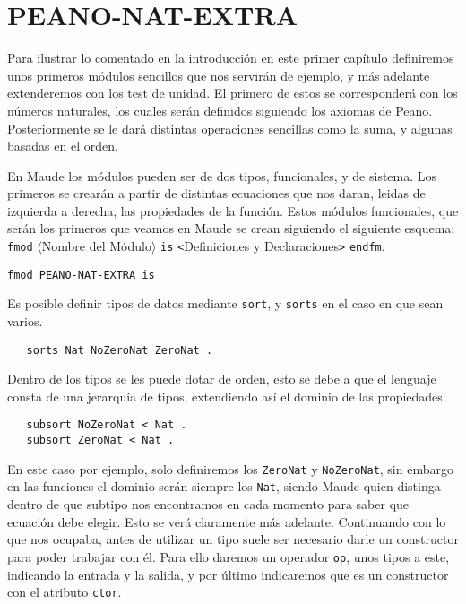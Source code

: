
\section{PEANO-NAT-EXTRA}

Para ilustrar lo comentado en la introducción en este primer capítulo definiremos unos primeros módulos sencillos que nos servirán de ejemplo, y más adelante extenderemos con los test de unidad.
El primero de estos se corresponderá con los números naturales, los cuales serán definidos siguiendo los axiomas de Peano. Posteriormente se le dará distintas operaciones sencillas como la suma, y algunas basadas en el orden.\par

En Maude los módulos pueden ser de dos tipos, funcionales, y de sistema. Los primeros se crearán a partir de distintas ecuaciones que nos daran, leidas de izquierda a derecha, las propiedades de la función. Estos módulos funcionales, que serán los primeros que veamos en Maude se crean siguiendo el siguiente esquema: \texttt{fmod} $\langle$Nombre del Módulo$\rangle$ \texttt{is} \verb"<"Definiciones y Declaraciones\verb">" \texttt{endfm}.\par

{\codesize
\begin{verbatim}
fmod PEANO-NAT-EXTRA is
\end{verbatim}
}

Es posible definir tipos de datos mediante \texttt{sort}, y \texttt{sorts} en el caso en que sean varios. \par

{\codesize
\begin{verbatim}
   sorts Nat NoZeroNat ZeroNat .
\end{verbatim}
}

Dentro de los tipos se les puede dotar de orden, esto se debe a que el lenguaje consta de una jerarquía de tipos, extendiendo así el dominio de las propiedades. \par

{\codesize
\begin{verbatim}
   subsort NoZeroNat < Nat .
   subsort ZeroNat < Nat .
\end{verbatim}
}

En este caso por ejemplo, solo definiremos los \texttt{ZeroNat} y \texttt{NoZeroNat}, sin embargo en las funciones el dominio serán siempre los \texttt{Nat}, siendo Maude quien distinga dentro de que subtipo nos encontramos en cada momento para saber que ecuación debe elegir. Esto se verá claramente más adelante. Continuando con lo que nos ocupaba, antes de utilizar un tipo suele ser necesario darle un constructor para poder trabajar con él. Para ello daremos un operador \texttt{op}, unos tipos a este, indicando la entrada y la salida, y por último indicaremos que es un constructor con el atributo \texttt{ctor}. \par

